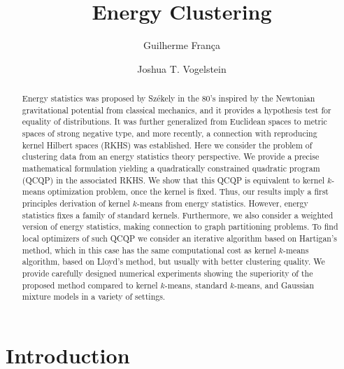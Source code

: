 \documentclass[aps,preprint,nofootinbib,floatfix]{revtex4-1}
\begin{document}
\title{Energy Clustering}

\author{Guilherme Fran\c ca}
\author{Joshua T. Vogelstein}


\begin{abstract}
Energy statistics was proposed by Sz\' ekely in the 80's inspired by the 
Newtonian gravitational potential from classical mechanics, and it provides 
a 
hypothesis test for equality of distributions. 
It was further generalized from Euclidean spaces to metric spaces of 
strong negative type, and more recently, a connection with reproducing 
kernel Hilbert spaces (RKHS) was established. 
Here we consider the problem of clustering data from an 
energy statistics theory perspective.
We provide a precise mathematical formulation 
yielding a quadratically constrained 
quadratic program (QCQP) in the associated RKHS. We show that this QCQP
is equivalent to kernel $k$-means optimization problem, once the kernel
is fixed.
Thus, our results imply a first principles derivation of kernel $k$-means 
from energy statistics.
However, energy statistics fixes a family of standard kernels.
Furthermore, we also consider a weighted version of energy statistics, 
making connection to graph partitioning problems.
To find local optimizers of such QCQP we consider an iterative algorithm based 
on Hartigan's method, which in this case has the same computational cost 
as kernel $k$-means algorithm, based on Lloyd's method, but usually 
with better clustering quality. 
We provide carefully designed numerical experiments showing the superiority 
of the proposed method compared to kernel $k$-means, standard $k$-means, 
and Gaussian mixture models in a variety of settings.
\end{abstract}


\maketitle


\section{Introduction}
\end{document}
